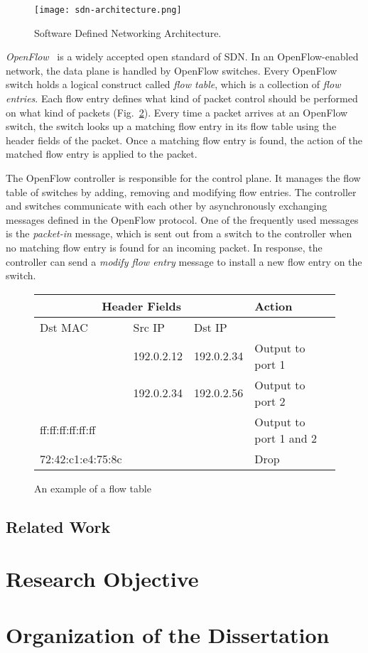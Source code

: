 \begin{figure}
    \centering
    \texttt{[image: sdn-architecture.png]}
    \caption{Software Defined Networking Architecture.}%
    \label{fig-sdn-architecture}
\end{figure}

\emph{OpenFlow}~\autocite{McKeown2008} is a widely accepted open
standard of SDN\@. In an OpenFlow-enabled network, the data plane is
handled by OpenFlow switches. Every OpenFlow switch holds a logical
construct called \emph{flow table}, which is a collection of \emph{flow
entries}. Each flow entry defines what kind of packet control should be
performed on what kind of packets (Fig.~\ref{tbl:flow-table}). Every
time a packet arrives at an OpenFlow switch, the switch looks up a
matching flow entry in its flow table using the header fields of the
packet. Once a matching flow entry is found, the action of the matched
flow entry is applied to the packet.

The OpenFlow controller is responsible for the control plane. It manages
the flow table of switches by adding, removing and modifying flow
entries. The controller and switches communicate with each other by
asynchronously exchanging messages defined in the OpenFlow protocol. One
of the frequently used messages is the \emph{packet-in} message, which
is sent out from a switch to the controller when no matching flow entry
is found for an incoming packet. In response, the controller can send a
\emph{modify flow entry} message to install a new flow entry on the
switch.

\begin{figure}
    \centering
    \begin{tabular}{lllll}
        \toprule
        \multicolumn{3}{c}{Header Fields}            &  Action                  \\ \midrule
        Dst MAC           & Src IP     & Dst IP      &                          \\ \midrule
                          & 192.0.2.12 & 192.0.2.34  & Output to port 1         \\
                          & 192.0.2.34 & 192.0.2.56  & Output to port 2         \\
        ff:ff:ff:ff:ff:ff &            &             & Output to port 1 and 2   \\
        72:42:c1:e4:75:8c &            &             & Drop                     \\
        \bottomrule
    \end{tabular}
    \caption{An example of a flow table}%
    \label{tbl:flow-table}
\end{figure}

\subsection{Related Work}

\section{Research Objective}

\section{Organization of the Dissertation}
